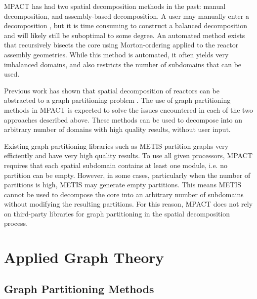 {{    MPACT has had two spatial decomposition methods in the past: manual decomposition, and assembly-based decomposition.
    A user may manually enter a decomposition \cite{StimpsonPartitioning2017}, but it is time consuming to construct a balanced decomposition and will likely still be suboptimal to some degree.
    An automated method exists that recursively bisects the core using Morton-ordering \cite{Morton1966} applied to the reactor assembly geometries.
    While this method is automated, it often yields very imbalanced domains, and also restricts the number of subdomains that can be used.

    Previous work has shown that spatial decomposition of reactors can be abstracted to a graph partitioning problem \cite{Fitzgerald2017}.
    The use of graph partitioning methods in MPACT is expected to solve the issues encountered in each of the two approaches described above.
    These methods can be used to decompose into an arbitrary number of domains with high quality results, without user input.

    Existing graph partitioning libraries such as METIS \cite{METIS} partition graphs very efficiently and have very high quality results.
    To use all given processors, MPACT requires that each spatial subdomain contains at least one module, i.e. no partition can be empty.
    However, in some cases, particularly when the number of partitions is high, METIS may generate empty partitions.
    This means METIS cannot be used to decompose the core into an arbitrary number of subdomains without modifying the resulting partitions.
    For this reason, MPACT does not rely on third-party libraries for graph partitioning in the spatial decomposition process.
  }
  \section{Applied Graph Theory}{\label{sec:Spatial Decomposition:Applied Graph Theory}
    \blindtext[2]
    \subsection{Graph Partitioning Methods}{\label{ssec:Spatial Decomposition:Graph Partitioning Methods}
      \blindtext[2]
}}}
